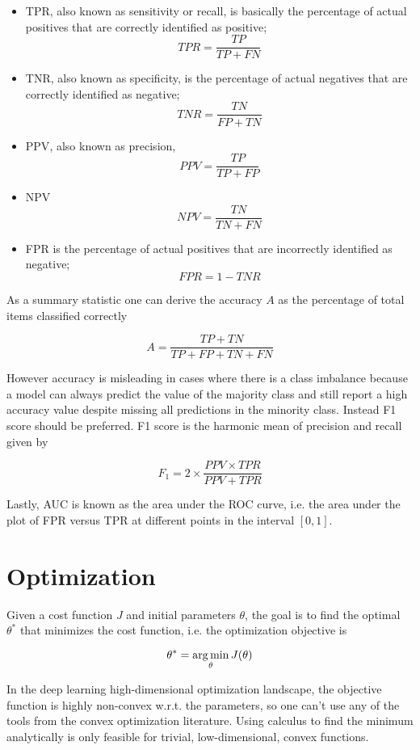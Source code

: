 \begin{itemize}
    \item \ac{TPR}, also known as sensitivity or recall, is basically the percentage of actual positives that are correctly identified as positive;
        $$TPR = \frac{TP}{TP + FN}$$
    \item \ac{TNR}, also known as specificity, is the percentage of actual negatives that are correctly identified as negative;
        $$TNR = \frac{TN}{FP + TN}$$
    \item \ac{PPV}, also known as precision,
        $$PPV = \frac{TP}{TP + FP}$$
    \item \ac{NPV}
        $$NPV = \frac{TN}{TN + FN}$$
    \item \ac{FPR} is the percentage of actual positives that are incorrectly identified as negative;
        $$FPR = 1 - TNR$$
\end{itemize}

As a summary statistic one can derive the accuracy $A$ as the percentage of total items classified correctly

$$
A = \frac{TP + TN}{TP + FP + TN + FN}
$$

However accuracy is misleading in cases where there is a class imbalance because a model can always predict the value of the majority class and still report a high accuracy value despite missing all predictions in the minority class. Instead F1 score should be preferred. F1 score is the harmonic mean of precision and recall given by

$$
F_1 = 2 \times \frac{PPV \times TPR}{PPV + TPR}
$$

Lastly, \ac{AUC} is known as the area under the \ac{ROC} curve, i.e. the area under the plot of \ac{FPR} versus \ac{TPR} at different points in the interval $[0, 1]$.

\section{Optimization}

Given a cost function $J$ and initial parameters $\theta$, the goal is to find the optimal $\theta^*$ that minimizes the cost function, i.e. the optimization objective is

$$
\theta^{*} = \operatorname*{arg\,min}_{\theta} J(\theta)
$$

In the deep learning high-dimensional optimization landscape, the objective function is highly non-convex w.r.t. the parameters, so one can't use any of the tools from the convex optimization literature. Using calculus to find the minimum analytically is only feasible for trivial, low-dimensional, convex functions.

